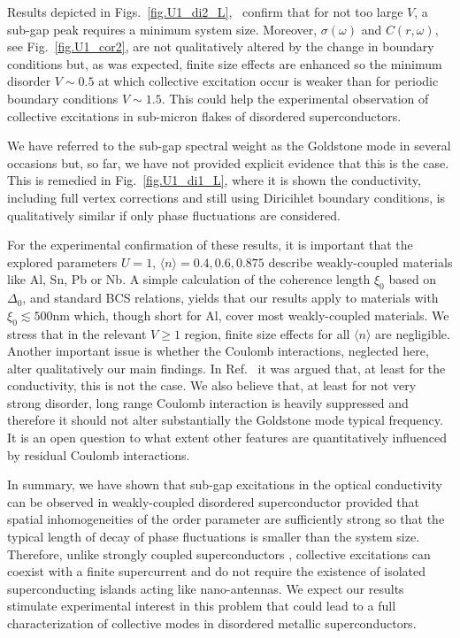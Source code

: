 \documentclass[Collective.tex]{revtex4-1}
\begin{document}
Results depicted in Figs.~\ref{fig.U1_di2_L},~ confirm that for not too large $V$, a sub-gap peak requires a minimum system size. Moreover, $\sigma(\omega)$ and $C(r,\omega)$, see Fig.~\ref{fig.U1_cor2}, are not qualitatively altered by the change in boundary conditions but, as was expected, finite size effects are enhanced so the minimum disorder $V \sim 0.5$ at which collective excitation occur is weaker than for periodic boundary conditions $V\sim1.5$. This could help the experimental observation of collective excitations in sub-micron flakes \cite{verdu2018} of disordered superconductors.

We have referred to the sub-gap spectral weight as the Goldstone mode in several occasions but, so far, we have not provided explicit evidence that this is the case. This is remedied in Fig.~\ref{fig.U1_di1_L}, where it is shown the conductivity, including full vertex corrections and still using Diricihlet boundary conditions, is qualitatively similar if only phase fluctuations are considered.

For the experimental confirmation of these results, it is important that the explored parameters $U=1$, $\langle n \rangle=0.4, 0.6, 0.875$ describe weakly-coupled materials like Al, Sn, Pb or Nb. A simple calculation of the coherence length $\xi_0$ based on $\Delta_0$, and standard BCS relations, yields that our results apply to materials with $\xi_0 \lesssim 500$nm which, though short for Al, cover most weakly-coupled materials. We stress that in the relevant $V \geq 1$ region, finite size effects for all $\langle n \rangle$ are negligible. Another important issue is whether the Coulomb interactions, neglected here, alter qualitatively our main findings. In Ref.~\cite{cea2014} it was argued that, at least for the conductivity, this is not the case. We also believe that, at least for not very strong disorder, long range Coulomb interaction is heavily suppressed and therefore it should not alter substantially the Goldstone mode typical frequency. It is an open question to what extent other features are quantitatively influenced by residual Coulomb interactions.

In summary, we have shown that sub-gap excitations in the optical conductivity can be observed in weakly-coupled disordered superconductor provided that spatial inhomogeneities of the order parameter are sufficiently strong so that the typical length of decay of phase fluctuations is smaller than the system size. 
Therefore, unlike strongly coupled superconductors \cite{cea2014}, collective excitations can coexist with a finite supercurrent and do not require the existence of isolated superconducting islands acting like nano-antennas. 
We expect our results stimulate experimental interest in this problem that could lead to a full characterization of collective modes in disordered metallic superconductors.  
\end{document}
